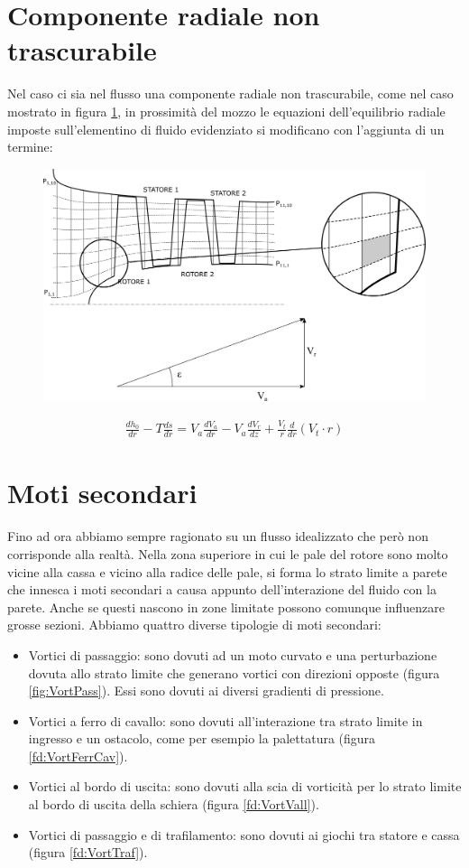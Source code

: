\section{Componente radiale non trascurabile}
Nel caso ci sia nel flusso una componente radiale non trascurabile, come nel caso mostrato in figura \ref{fd:comp_rad}, in prossimità del mozzo le equazioni dell'equilibrio radiale imposte sull'elementino di fluido evidenziato si modificano con l'aggiunta di un termine:
\begin{figure}
\centering
  \includegraphics[width=.8\textwidth]{fig/comp_rad.pdf}
\caption{}
\label{fd:comp_rad}
\end{figure}
\begin{align*}
\frac{d h_0}{dr} - T\frac{ds}{dr} = V_a \frac{dV_a}{dr} - \boxed{V_a \frac{dV_r}{dz}} + \frac{V_t}{r} \frac{d}{dr} ( V_t \cdot r)
\end{align*}

\section{Moti secondari}
Fino ad ora abbiamo sempre ragionato su un flusso idealizzato che però non corrisponde alla realtà. Nella zona superiore in cui le pale del rotore sono molto vicine alla cassa e vicino alla radice delle pale, si forma lo strato limite a parete che innesca i moti secondari a causa appunto dell'interazione del fluido con la parete. Anche se questi nascono in zone limitate possono comunque influenzare grosse sezioni.
Abbiamo quattro diverse tipologie di moti secondari:
\begin{itemize}
\item Vortici di passaggio: sono dovuti ad un moto curvato e una perturbazione dovuta allo strato limite che generano vortici con direzioni opposte (figura \ref{fig:VortPass}). Essi sono dovuti ai diversi gradienti di pressione.
\item Vortici a ferro di cavallo: sono dovuti all'interazione tra strato limite in ingresso e un ostacolo, come per esempio la palettatura (figura \ref{fd:VortFerrCav}).
\item Vortici al bordo di uscita: sono dovuti alla scia di vorticità per lo strato limite al bordo di uscita della schiera (figura \ref{fd:VortVall}).
\item Vortici di passaggio e di trafilamento: sono dovuti ai giochi tra statore e cassa (figura \ref{fd:VortTraf}).
\end{itemize}

